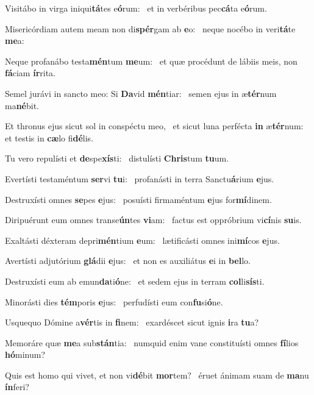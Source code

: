 \item Visitábo in virga iniqui\textbf{tá}tes e\textbf{ó}rum:~\psstar{} et in verbéribus pec\textbf{cá}ta e\textbf{ó}rum.
\item Misericórdiam autem meam non di\textbf{spér}gam ab \textbf{e}o:~\psstar{} neque nocébo in veri\textbf{tá}te \textbf{me}a:
\item Neque profanábo testa\textbf{mén}tum \textbf{me}um:~\psstar{} et quæ procédunt de lábiis meis, non \textbf{fá}ciam \textbf{ír}rita.
\item Semel jurávi in sancto meo: Si \textbf{Da}vid \textbf{mén}tiar:~\psstar{} semen ejus in æ\textbf{tér}num ma\textbf{né}bit.
\item Et thronus ejus sicut sol in conspéctu meo,~\pscross{} et sicut luna perfécta \textbf{in} æ\textbf{tér}num:~\psstar{} et testis in \textbf{cæ}lo fi\textbf{dé}lis.
\item Tu vero repulísti et \textbf{de}spe\textbf{xís}ti:~\psstar{} distulísti \textbf{Chris}tum \textbf{tu}um.
\item Evertísti testaméntum \textbf{ser}vi \textbf{tu}i:~\psstar{} profanásti in terra Sanctu\textbf{á}rium \textbf{e}jus.
\item Destruxísti omnes \textbf{se}pes \textbf{e}jus:~\psstar{} posuísti firmaméntum \textbf{e}jus for\textbf{mí}dinem.
\item Diripuérunt eum omnes transe\textbf{ún}tes \textbf{vi}am:~\psstar{} factus est oppróbrium vi\textbf{cí}nis \textbf{su}is.
\item Exaltásti déxteram depri\textbf{mén}tium \textbf{e}um:~\psstar{} lætificásti omnes ini\textbf{mí}cos \textbf{e}jus.
\item Avertísti adjutórium \textbf{glá}dii \textbf{e}jus:~\psstar{} et non es auxiliátus \textbf{e}i in \textbf{bel}lo.
\item Destruxísti eum ab emun\textbf{da}ti\-\textbf{ó}ne:~\psstar{} et sedem ejus in terram \textbf{col}li\textbf{sís}ti.
\item Minorásti dies \textbf{tém}poris \textbf{e}jus:~\psstar{} perfudísti eum con\textbf{fu}si\textbf{ó}ne.
\item Usquequo Dómine a\textbf{vér}tis in \textbf{fi}nem:~\psstar{} exardéscet sicut ignis \textbf{i}ra \textbf{tu}a?
\item Memoráre quæ \textbf{me}a sub\textbf{stán}\-tia:~\psstar{} numquid enim vane constituísti omnes \textbf{fí}lios \textbf{hó}minum?
\item Quis est homo qui vivet, et non vi\textbf{dé}bit \textbf{mor}tem?~\psstar{} éruet ánimam suam de \textbf{ma}nu \textbf{ín}feri?
